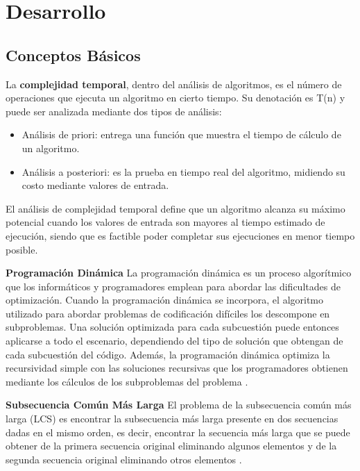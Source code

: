\chapter{Desarrollo}

\section{Conceptos Básicos}
    La \textbf{complejidad temporal}, dentro del análisis de algoritmos, es el número de operaciones que ejecuta un algoritmo en cierto tiempo. Su denotación es T(n) y puede ser analizada mediante dos tipos de análisis:
    
    \begin{itemize}
        \item Análisis de priori: entrega una función que muestra el tiempo de cálculo de un algoritmo.
        \item Análisis a posteriori: es la prueba en tiempo real del algoritmo, midiendo su costo mediante valores de entrada. 
    \end{itemize}
    
    El análisis de complejidad temporal define que un algoritmo alcanza su máximo potencial cuando los valores de entrada son mayores al tiempo estimado de ejecución, siendo que es factible poder completar sus ejecuciones en menor tiempo posible. 
    
    \textbf{Programación Dinámica} La programación dinámica es un proceso algorítmico que los informáticos y programadores emplean para abordar las dificultades de optimización. Cuando la programación dinámica se incorpora, el algoritmo utilizado para abordar problemas de codificación difíciles los descompone en subproblemas. Una solución optimizada para cada subcuestión puede entonces aplicarse a todo el escenario, dependiendo del tipo de solución que obtengan de cada subcuestión del código. Además, la programación dinámica optimiza la recursividad simple con las soluciones recursivas que los programadores obtienen mediante los cálculos de los subproblemas del problema \cite{ProDina}.

    \textbf{ Subsecuencia Común Más Larga} El problema de la subsecuencia común más larga (LCS) es encontrar la subsecuencia más larga presente en dos secuencias dadas en el mismo orden, es decir, encontrar la secuencia más larga que se puede obtener de la primera secuencia original eliminando algunos elementos y de la segunda secuencia original eliminando otros elementos \cite{Sub}.

